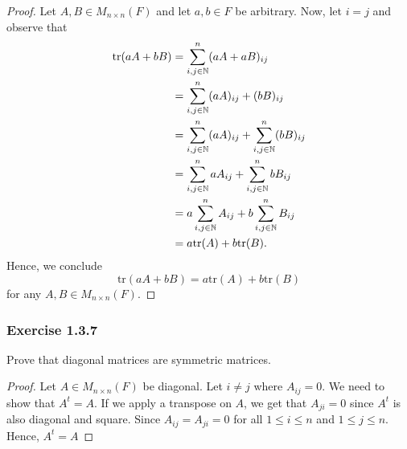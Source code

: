 \begin{proof}
Let \( A , B \in M_{n \times n }(F) \) and let \( a,b \in F  \) be arbitrary.  Now, let \( i = j  \) and observe that 
\begin{align*}
    \text{tr}(aA + bB) &= \sum_{ i,j \in \mathbb{N}  }^{ n  } (aA + aB )_{ij} \\
                       &= \sum_{ i,j \in \mathbb{N}  }^{ n  } (aA)_{ij} + (bB)_{ij} \\
                       &= \sum_{ i,j \in \mathbb{N}  }^{ n  } (aA)_{ij} + \sum_{ i,j \in \mathbb{N}  }^{ n  } (bB)_{ij} \\
                       &= \sum_{ i,j \in \mathbb{N}  }^{ n  } a A_{ij} + \sum_{ i,j \in \mathbb{N}  }^{ n  } b B_{ij} \\
                       &= a \sum_{ i,j \in \mathbb{N}  }^{ n  } A_{ij} + b \sum_{ i,j \in \mathbb{N}  }^{ n } B_{ij} \\
                       &= a \text{tr}(A) + b \text{tr}(B).
\end{align*}
Hence, we conclude 
\[  \text{tr}(aA + bB ) = a \text{tr}(A) + b \text{tr}(B) \]
for any \( A, B \in M_{n \times n }(F ) \).
\end{proof}

\subsubsection{Exercise 1.3.7} 
Prove that diagonal matrices are symmetric matrices.

\begin{proof}
Let \( A \in M_{n \times n }(F) \) be diagonal. Let \( i \neq  j  \) where \( A_{ij} = 0  \). We need to show that \( A^{t} = A  \). If we apply a transpose on \( A  \), we get that \( A_{ji} = 0  \) since \( A^{t}   \) is also diagonal and square. Since \( A_{ij} = A_{ji} = 0  \) for all \( 1 \leq i \leq n  \) and \( 1 \leq j \leq n  \). Hence,  \( A^{t} = A \)
\end{proof}


